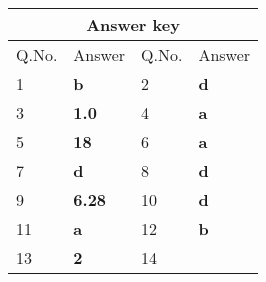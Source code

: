 \begin{enumerate}
\begin{answer}
	\end{answer}
	\setlength\arrayrulewidth{1pt}
\begin{table}[H]
	\centering
	\begin{tabular}{|p{1.5cm}|p{1.5cm}||p{1.5cm}|p{1.5cm}|}
		\hline
		\multicolumn{4}{|c|}{\textbf{Answer key}}\\\hline\hline
		\rowcolor{ocrel}Q.No.&Answer&Q.No.&Answer\\\hline
		1&\textbf{b} &2&\textbf{d}\\\hline 
		3&\textbf{1.0} &4&\textbf{a} \\\hline
		5&\textbf{18} &6&\textbf{a} \\\hline
		7&\textbf{d}&8&\textbf{d}\\\hline
		9&\textbf{6.28}&10&\textbf{d}\\\hline
		11&\textbf{a} &12&\textbf{b}\\\hline
		13&\textbf{2}&14&\textbf{}\\\hline
		
	\end{tabular}
\end{table}
\end{enumerate}